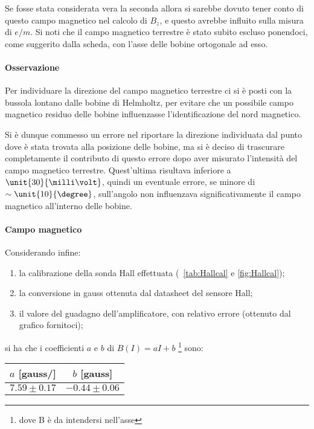 \documentclass[10pt,a4paper]{article}
\begin{document}
Se fosse stata considerata vera la seconda allora si sarebbe dovuto tener conto di questo campo magnetico nel calcolo di $B_z$, e questo avrebbe influito sulla misura di $e/m$. Si noti che il campo magnetico terrestre è stato subito escluso ponendoci, come suggerito dalla scheda, con l'asse delle bobine ortogonale ad esso.

\paragraph{Osservazione} Per individuare la direzione del campo magnetico terrestre ci si è posti con la bussola lontano dalle bobine di Helmholtz, per evitare che un possibile campo magnetico residuo delle bobine influenzasse l'identificazione del nord magnetico. 

Si è dunque commesso un errore nel riportare la direzione individuata dal punto dove è stata trovata alla posizione delle bobine, ma si è deciso di trascurare completamente il contributo di questo errore dopo aver misurato l'intensità del campo magnetico terrestre.
Quest'ultima risultava inferiore a $\unit{30}{\milli\volt}$, quindi un eventuale errore, se minore di $\sim \unit{10}{\degree}$, sull'angolo non influenzava significativamente il campo magnetico all'interno delle bobine.

\paragraph{Campo magnetico} Considerando infine:
\begin{enumerate}
	\item la calibrazione della sonda Hall effettuata (\tablename{~\ref{tab:Hallcal}} e \figurename{\ref{fig:Hallcal}});
	\item la conversione in gauss ottenuta dal datasheet del sensore Hall;
	\item il valore del guadagno dell'amplificatore, con relativo errore (ottenuto dal grafico fornitoci);
\end{enumerate}
si ha che i coefficienti $a$ e $b$ di $B(I)=aI+b$ \footnote{dove B è da intendersi nell'asse} sono:

\begin{table}[H]
	\centering
	\begin{tabular}{c|c}
		$a$ [gauss/\ampere] & $b$ [gauss]\\
		\hline
		$7.59 \pm 0.17$ & $-0.44 \pm 0.06$\\
	\end{tabular}
\end{table}
\end{document}
